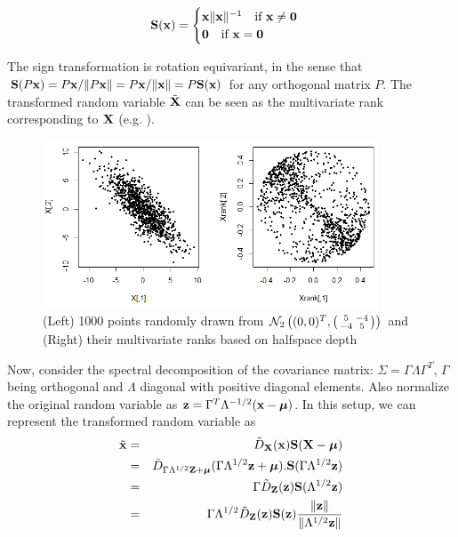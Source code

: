 \documentclass[fleqn,12pt]{article}
\begin{document}
$$ {\mathbf{S}}({\bf{x}}) = \begin{cases} {\bf{x}}\| {\bf{x}} \|^{-1} \quad \mbox{if }{\bf{x}} \neq \bf0\\
\bf0 \quad \mbox{if }{\bf{x}} = \bf0 \end{cases} $$

The sign transformation is rotation equivariant, in the sense that $ {\mathbf{S}}(P {\bf{x}}) = P{\bf{x}}/\| P {\bf{x}} \| = P{\bf{x}}/\| {\bf{x}} \| = P {\mathbf{S}}({\bf{x}})$ for any orthogonal matrix $P$. The transformed random variable $\tilde {{\mathbf{X}}}$ can be seen as the multivariate rank corresponding to ${\mathbf{X}}$ (e.g. \cite{serfling2006}).

\begin{figure}[t]
	\captionsetup{singlelinecheck=off}
	\centering
		\includegraphics[height=5cm]{../Codes/rankplot.png}
	\caption{(Left) 1000 points randomly drawn from $\mathcal N_2\left((0,0)^T, \left(\protect\begin{smallmatrix} 5 & -4 \\ -4 & 5 \protect\end{smallmatrix}\right)\right) $ and (Right) their multivariate ranks based on halfspace depth}
	\label{fig:rankplot}
\end{figure}

Now, consider the spectral decomposition of the covariance matrix: $\Sigma = \Gamma\Lambda\Gamma^T$, $\Gamma$ being orthogonal and $\Lambda$ diagonal with positive diagonal elements. Also normalize the original random variable as ${\bf{z}} = \Gamma^T\Lambda^{-1/2} ({\bf{x}} - {\boldsymbol{\mu}})$. In this setup, we can represent the transformed random variable as
\begin{eqnarray*}
\tilde {{\bf{x}}} &=& \tilde D_{{\mathbf{X}}} ({\bf{x}}) {\mathbf{S}}({\mathbf{X}} - {\boldsymbol{\mu}})\\
&=& \tilde D_{\Gamma\Lambda^{1/2}{\mathbf{Z}} + {\boldsymbol{\mu}}} (\Gamma\Lambda^{1/2} {\bf{z}} + {\boldsymbol{\mu}}). {\mathbf{S}}(\Gamma\Lambda^{1/2} {\bf{z}})\\
&=& \Gamma \tilde D_{{\mathbf{Z}}}({\bf{z}}) {\mathbf{S}}(\Lambda^{1/2}{\bf{z}})\\
&=& \Gamma \Lambda^{1/2} \tilde D_{{\mathbf{Z}}}({\bf{z}}) {\mathbf{S}}({\bf{z}}) \frac{\| {\bf{z}} \|}{\|\Lambda^{1/2} {\bf{z}}\|}
\end{eqnarray*}
\end{document}
